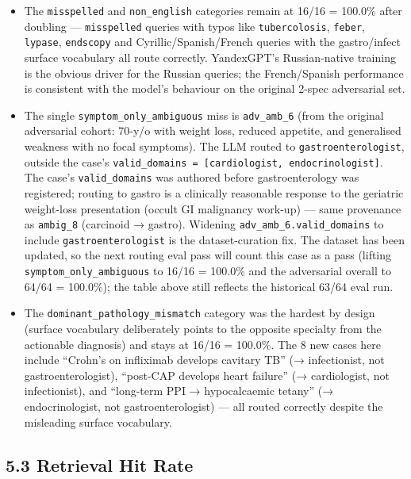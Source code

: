 \documentclass[
  american,
  a4paper,
]{article}
\providecommand{\tightlist}{%
  \setlength{\itemsep}{0pt}\setlength{\parskip}{0pt}}
\begin{document}
\begin{itemize}
\tightlist
\item
  The \texttt{misspelled} and \texttt{non\_english} categories remain at
  16/16 = 100.0\% after doubling --- \texttt{misspelled} queries with
  typos like \texttt{tubercolosis}, \texttt{feber}, \texttt{lypase},
  \texttt{endscopy} and Cyrillic/Spanish/French queries with the
  gastro/infect surface vocabulary all route correctly. YandexGPT's
  Russian-native training is the obvious driver for the Russian queries;
  the French/Spanish performance is consistent with the model's
  behaviour on the original 2-spec adversarial set.
\item
  The single \texttt{symptom\_only\_ambiguous} miss is
  \texttt{adv\_amb\_6} (from the original adversarial cohort: 70-y/o
  with weight loss, reduced appetite, and generalised weakness with no
  focal symptoms). The LLM routed to \texttt{gastroenterologist},
  outside the case's
  \texttt{valid\_domains\ =\ {[}cardiologist,\ endocrinologist{]}}. The
  case's \texttt{valid\_domains} was authored before gastroenterology
  was registered; routing to gastro is a clinically reasonable response
  to the geriatric weight-loss presentation (occult GI malignancy
  work-up) --- same provenance as \texttt{ambig\_8} (carcinoid →
  gastro). Widening \texttt{adv\_amb\_6.valid\_domains} to include
  \texttt{gastroenterologist} is the dataset-curation fix. The dataset
  has been updated, so the next routing eval pass will count this case
  as a pass (lifting \texttt{symptom\_only\_ambiguous} to 16/16 =
  100.0\% and the adversarial overall to 64/64 = 100.0\%); the table
  above still reflects the historical 63/64 eval run.
\item
  The \texttt{dominant\_pathology\_mismatch} category was the hardest by
  design (surface vocabulary deliberately points to the opposite
  specialty from the actionable diagnosis) and stays at 16/16 = 100.0\%.
  The 8 new cases here include ``Crohn's on infliximab develops cavitary
  TB'' (→ infectionist, not gastroenterologist), ``post-CAP develops
  heart failure'' (→ cardiologist, not infectionist), and ``long-term
  PPI → hypocalcaemic tetany'' (→ endocrinologist, not
  gastroenterologist) --- all routed correctly despite the misleading
  surface vocabulary.
\end{itemize}

\subsection{5.3 Retrieval Hit Rate}\label{retrieval-hit-rate}
\end{document}
